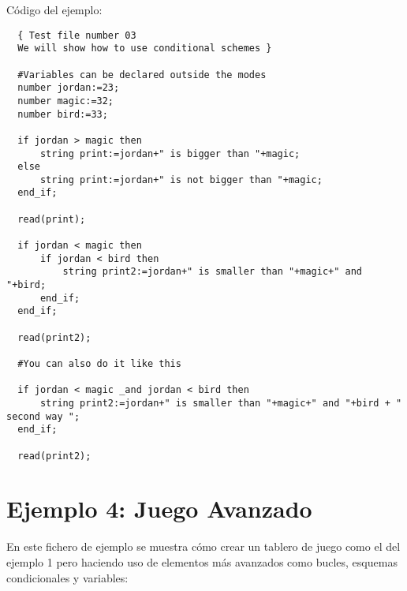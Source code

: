 \documentclass[a4paper,12pt,twoside,openright]{report}
\begin{document}
  Código del ejemplo:
  \begin{lstlisting}
  { Test file number 03
  We will show how to use conditional schemes }

  #Variables can be declared outside the modes
  number jordan:=23;
  number magic:=32;
  number bird:=33;

  if jordan > magic then
	  string print:=jordan+" is bigger than "+magic;
  else
	  string print:=jordan+" is not bigger than "+magic;
  end_if;

  read(print);

  if jordan < magic then
	  if jordan < bird then
		  string print2:=jordan+" is smaller than "+magic+" and "+bird;
	  end_if;
  end_if;

  read(print2);

  #You can also do it like this

  if jordan < magic _and jordan < bird then
	  string print2:=jordan+" is smaller than "+magic+" and "+bird + " second way ";
  end_if;

  read(print2);

  \end{lstlisting}

  \section{Ejemplo 4: Juego Avanzado}
  
  En este fichero de ejemplo se muestra cómo crear un tablero de juego como el del ejemplo 1 pero haciendo uso 
  de elementos más avanzados como bucles, esquemas condicionales y variables:
  
\end{document}
